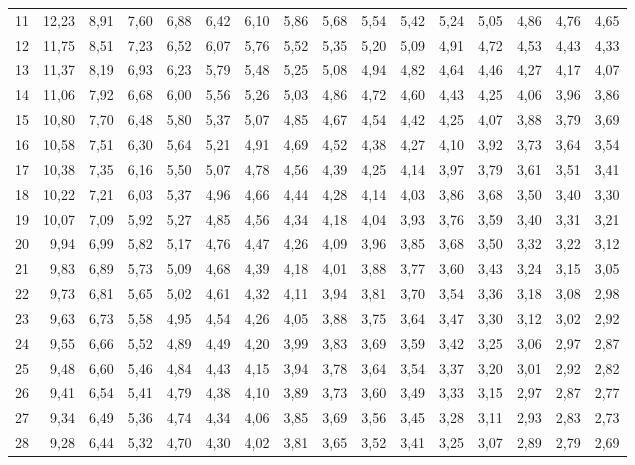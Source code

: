 \documentclass[a4paper,10pt]{extarticle}
\begin{document}
\begin{center}
\begin{tabular}{r|rrrrrrrrrrrrrrr}
11 & 12,23 & 8,91 & 7,60 & 6,88 & 6,42 & 6,10 & 5,86 & 5,68 & 5,54 & 5,42 & 5,24 & 5,05 & 4,86 & 4,76 & 4,65\\
12 & 11,75 & 8,51 & 7,23 & 6,52 & 6,07 & 5,76 & 5,52 & 5,35 & 5,20 & 5,09 & 4,91 & 4,72 & 4,53 & 4,43 & 4,33\\
13 & 11,37 & 8,19 & 6,93 & 6,23 & 5,79 & 5,48 & 5,25 & 5,08 & 4,94 & 4,82 & 4,64 & 4,46 & 4,27 & 4,17 & 4,07\\
14 & 11,06 & 7,92 & 6,68 & 6,00 & 5,56 & 5,26 & 5,03 & 4,86 & 4,72 & 4,60 & 4,43 & 4,25 & 4,06 & 3,96 & 3,86\\
15 & 10,80 & 7,70 & 6,48 & 5,80 & 5,37 & 5,07 & 4,85 & 4,67 & 4,54 & 4,42 & 4,25 & 4,07 & 3,88 & 3,79 & 3,69\\
16 & 10,58 & 7,51 & 6,30 & 5,64 & 5,21 & 4,91 & 4,69 & 4,52 & 4,38 & 4,27 & 4,10 & 3,92 & 3,73 & 3,64 & 3,54\\
17 & 10,38 & 7,35 & 6,16 & 5,50 & 5,07 & 4,78 & 4,56 & 4,39 & 4,25 & 4,14 & 3,97 & 3,79 & 3,61 & 3,51 & 3,41\\
18 & 10,22 & 7,21 & 6,03 & 5,37 & 4,96 & 4,66 & 4,44 & 4,28 & 4,14 & 4,03 & 3,86 & 3,68 & 3,50 & 3,40 & 3,30\\
19 & 10,07 & 7,09 & 5,92 & 5,27 & 4,85 & 4,56 & 4,34 & 4,18 & 4,04 & 3,93 & 3,76 & 3,59 & 3,40 & 3,31 & 3,21\\
20 & 9,94 & 6,99 & 5,82 & 5,17 & 4,76 & 4,47 & 4,26 & 4,09 & 3,96 & 3,85 & 3,68 & 3,50 & 3,32 & 3,22 & 3,12\\
21 & 9,83 & 6,89 & 5,73 & 5,09 & 4,68 & 4,39 & 4,18 & 4,01 & 3,88 & 3,77 & 3,60 & 3,43 & 3,24 & 3,15 & 3,05\\
22 & 9,73 & 6,81 & 5,65 & 5,02 & 4,61 & 4,32 & 4,11 & 3,94 & 3,81 & 3,70 & 3,54 & 3,36 & 3,18 & 3,08 & 2,98\\
23 & 9,63 & 6,73 & 5,58 & 4,95 & 4,54 & 4,26 & 4,05 & 3,88 & 3,75 & 3,64 & 3,47 & 3,30 & 3,12 & 3,02 & 2,92\\
24 & 9,55 & 6,66 & 5,52 & 4,89 & 4,49 & 4,20 & 3,99 & 3,83 & 3,69 & 3,59 & 3,42 & 3,25 & 3,06 & 2,97 & 2,87\\
25 & 9,48 & 6,60 & 5,46 & 4,84 & 4,43 & 4,15 & 3,94 & 3,78 & 3,64 & 3,54 & 3,37 & 3,20 & 3,01 & 2,92 & 2,82\\
26 & 9,41 & 6,54 & 5,41 & 4,79 & 4,38 & 4,10 & 3,89 & 3,73 & 3,60 & 3,49 & 3,33 & 3,15 & 2,97 & 2,87 & 2,77\\
27 & 9,34 & 6,49 & 5,36 & 4,74 & 4,34 & 4,06 & 3,85 & 3,69 & 3,56 & 3,45 & 3,28 & 3,11 & 2,93 & 2,83 & 2,73\\
28 & 9,28 & 6,44 & 5,32 & 4,70 & 4,30 & 4,02 & 3,81 & 3,65 & 3,52 & 3,41 & 3,25 & 3,07 & 2,89 & 2,79 & 2,69\\

\end{tabular}
\end{center}
\end{document}
